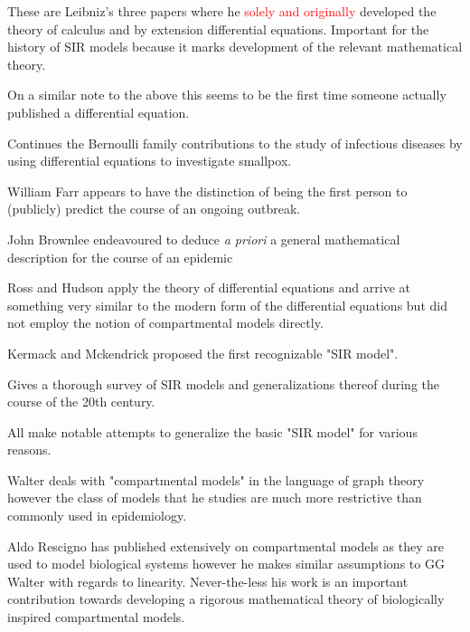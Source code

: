 \cite{leibniz18591684, leibniz12supplementum, leibniz1863geometria} These are Leibniz's three papers where he \textcolor{red}{solely and originally} developed the theory of calculus and by extension differential equations. Important for the history of SIR models because it marks development of the relevant mathematical theory.

\cite{bernoulli1695explicationes} On a similar note to the above this seems to be the first time someone actually published a differential equation. 

\cite{bernoulli2004attempt} Continues the Bernoulli family contributions to the study of infectious diseases by using differential equations to investigate smallpox.

\cite{farr1866cattle, lilienfeld2007celebration, evans1876some} William Farr appears to have the distinction of being the first person to (publicly) predict the course of an ongoing outbreak.

\cite{BROWNLEE1915125, BrownleeJohn1916OTCO} John Brownlee endeavoured to deduce \textit{a priori} a general mathematical description for the course of an epidemic

\cite{ross1916application, ross1917application, RonaldRoss1917AAot} Ross and Hudson apply the theory of differential equations and arrive at something very similar to the modern form of the differential equations but did not employ the notion of compartmental models directly.

\cite{kermack1927contribution, brauer2005kermack} Kermack and Mckendrick proposed the first recognizable "SIR model".

\cite{hethcote2000mathematics} Gives a thorough survey of SIR models and generalizations thereof during the course of the 20th century.

\cite{reveller1969optimization, capasso1978generalization, satsuma2004extending} All make notable attempts to generalize the basic "SIR model" for various reasons.

\cite{walter1983some, walter1984eigenvalues, walter1985complex} Walter deals with "compartmental models" in the language of graph theory however the class of models that he studies are much more restrictive than commonly used in epidemiology. 

\cite{rescigno1960synthesis, rescigno1962analysis, rescigno1964some, rescigno1965some, rescigno1999compartmental, rescigno2001rise} Aldo Rescigno has published extensively on compartmental models as they are used to model biological systems however he makes similar assumptions to GG Walter with regards to linearity. Never-the-less his work is an important contribution towards developing a rigorous mathematical theory of biologically inspired compartmental models.

